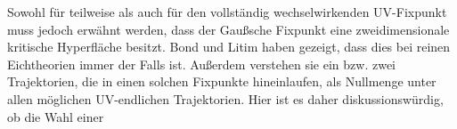   Sowohl für teilweise als auch für den vollständig wechselwirkenden 
  UV-Fixpunkt muss jedoch erwähnt werden, dass der Gaußsche Fixpunkt eine 
  zweidimensionale kritische Hyperfläche besitzt. Bond und Litim haben 
  gezeigt, dass dies bei reinen Eichtheorien immer der Falls ist. Außerdem 
  verstehen sie ein bzw. zwei Trajektorien, die in einen solchen Fixpunkte 
  hineinlaufen, als Nullmenge unter allen möglichen UV-endlichen Trajektorien. 
  Hier ist es daher diskussionswürdig, ob die Wahl einer
  